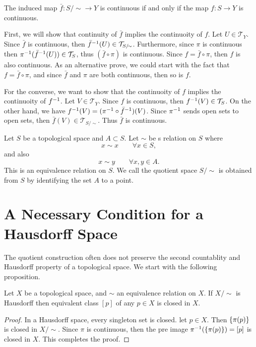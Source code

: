 \begin{proposition}
	\label{prop:ContinousInducedmap}
	The induced map $ \bar{f}:S/\sim \to Y $ is continuous if and only if the map $ f: S \to Y $ is continuous.
\end{proposition}
\begin{solution}
	First, we will show that continuity of $ \bar{f} $ implies the continuoity of $ f $. Let $ U \in \mathcal{T}_Y $. Since $ \bar{f} $ is continuous, then $ \inv{\bar{f}}(U) \in \mathcal{T}_{S/\sim} $. Furthermore, since $ \pi $ is continuous then $ \pi^{-1}(\bar{f}^{-1}(U)) \in \mathcal{T}_{S} $, thus $ (\bar{f}\circ \pi) $ is continuous. Since $  f = \bar{f}\circ \pi $, then $ f $ is also continuous. As an alternative prove, we could start with the fact that $ f = \bar{f}\circ \pi $, and since $ \bar{f} $ and $ \pi $ are both continuous, then so is $ f $.
	
	For the converse, we want to show that the continuoity of $ f $ implies the continuoity of $ f^{-1} $. Let $ V \in \mathcal{T}_Y $. Since $ f $ is continuous, then $ f^{-1}(V) \in \mathcal{T}_S $. On the other hand, we have $ f^{-1}(V) =( \pi^{-1}\circ \bar{f}^{-1})(V) $. Since $ \pi^{-1} $ sends open sets to open sets, then $ \bar{f}(V) \in \mathcal{T}_{S/\sim} $. Thus $ \bar{f} $ is continuous.
\end{solution}

\begin{definition}
	Let $ S $ be a topological space and $ A \subset S $. Let $ \sim $ be s relation on $ S $ where 
	\[ x\sim x \qquad \forall x \in S, \]
	and also
	\[ x\sim y \qquad \forall x,y \in A. \]
	This is an equivalence relation on $ S $. We call the quotient space $ S/\sim $ is obtained from $ S $ by identifying the set $ A $ to a point.
\end{definition}

\section{A Necessary Condition for a Hausdorff Space}
The quotient construction often does not preserve the second countablity and Hausdorff property of a topological space. We start with the following proposition.

\begin{proposition}
	Let $ X $ be a topological space, and $ \sim $ an equivalence relation on $ X $. If $ X/\sim $ is Hausdorff then equivalent class $ [p] $ of any $ p \in X $ is closed in $ X $.
\end{proposition}
\begin{proof}
	In a Hausdorff space, every singleton set is closed. let $ p \in X $. Then $ \{\pi(p)\} $ is closed in $ X/\sim $. Since $ \pi $ is continuous, then the pre image $ \pi^{-1}(\{\pi(p)\}) = [p] $ is closed in $ X $. This completes the proof.
\end{proof}

